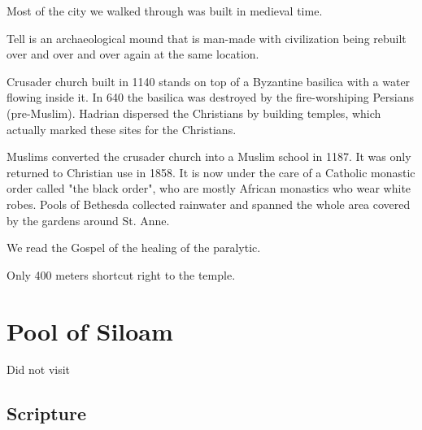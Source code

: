 \documentclass[letterpaper]{report}
\begin{document}
\begin{multicols}{2}
Most of the city we walked through was built in medieval time.

Tell is an archaeological mound that is man-made with civilization being rebuilt over and over and over again at the same location. 

Crusader church built in 1140 stands on top of a Byzantine basilica with a water flowing inside it. In 640 the basilica was destroyed by the fire-worshiping Persians (pre-Muslim).
Hadrian dispersed the Christians by building temples, which actually marked these sites for the Christians.

Muslims converted the crusader church into a Muslim school in 1187. It was only returned to Christian use in 1858. It is now under the care of a Catholic monastic order called "the black order", who are mostly African monastics who wear white robes.
Pools of Bethesda collected rainwater and spanned the whole area covered by the gardens around St. Anne.

We read the Gospel of the healing of the paralytic.

Only 400 meters shortcut right to the temple.

\end{multicols}

\clearpage
\section{Pool of Siloam}
\begin{multicols}{2}
	\mbox{}
 Did not visit
\end{multicols}
\subsection{Scripture}
\end{document}
